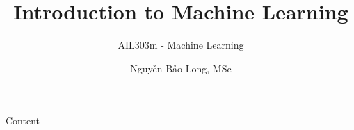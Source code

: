 \documentclass[notheorems, aspectratio=169]{beamer}
\title{Introduction to Machine Learning}
\subtitle{AIL303m - Machine Learning}
\author{Nguyễn Bảo Long, MSc}
\begin{document}
\begin{frame}
	\titlepage
\end{frame}

\begin{frame}{Content}
	\tableofcontents
\end{frame}





\end{document}
